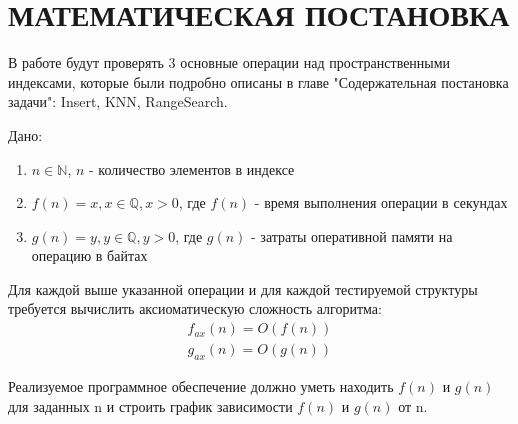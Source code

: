 \chapter{МАТЕМАТИЧЕСКАЯ ПОСТАНОВКА}
\label{cha:math}

В работе будут проверять 3 основные операции над пространственными индексами, которые были подробно описаны в главе "Содержательная постановка задачи": Insert, KNN, RangeSearch.

Дано:
\begin{enumerate}
    \item $n \in \mathbb{N}$, $n$ - количество элементов в индексе
    \item $f(n) = x, x \in  \mathbb{Q}, x > 0$, где $f(n)$ - время выполнения операции в секундах
    \item $g(n) = y, y \in  \mathbb{Q}, y > 0$, где $g(n)$ - затраты оперативной памяти на операцию в байтах
\end{enumerate}
Для каждой выше указанной операции и для каждой тестируемой структуры требуется вычислить аксиоматическую сложность алгоритма:
\begin{align}
    f_{ax}(n) = O(f(n)) \\
    g_{ax}(n) = O(g(n))
\end{align}

Реализуемое программное обеспечение должно уметь находить $f(n)$ и $g(n)$ для заданных n и строить график зависимости $f(n)$ и $g(n)$ от n.
